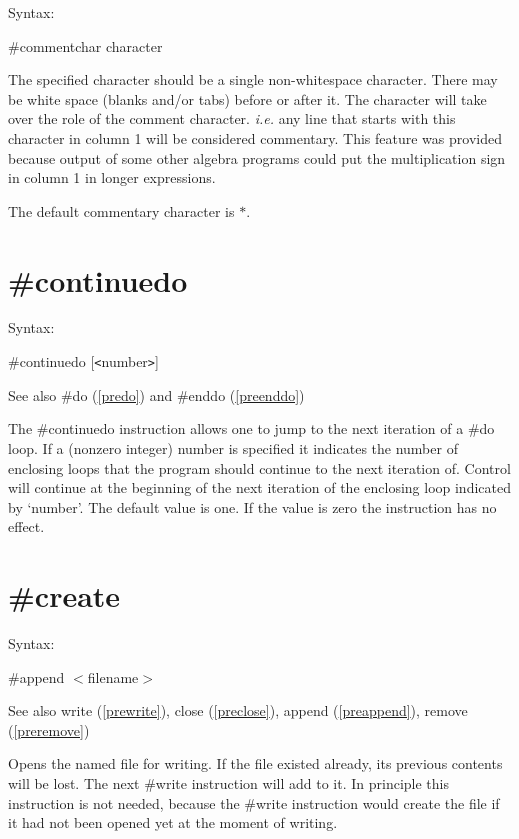 \noindent Syntax:

\#commentchar character

\noindent The specified character should be a single 
non-whitespace character. There may be white space (blanks and/or tabs) 
before or after it. The character will take over the role of the comment 
character. {\it i.e.} any line that starts with this character in column 1 
will be considered commentary. This feature was provided 
because output of some other algebra programs could put the multiplication 
sign in column 1 in longer expressions.

The default commentary character is $\ast$.


\section{\#continuedo}
\label{precontinuedo}

\noindent Syntax:

\#continuedo [{\tt<}number{\tt>}]

\noindent See also \#do (\ref{predo}) and \#enddo (\ref{preenddo})

\noindent The \#continuedo instruction allows one to
jump to the next iteration of a \#do loop.
If a (nonzero integer) number is specified
it indicates the number of enclosing loops
that the program should continue to the next iteration of.
Control will continue at the beginning of the next iteration
of the enclosing loop indicated by `number'.
The default value is one.
If the value is zero the instruction has no effect.

 
\section{\#create}
\label{precreate}

\noindent Syntax:

\#append $<$filename$>$
 
\noindent See also write (\ref{prewrite}),
            close (\ref{preclose}), append (\ref{preappend}),
            remove (\ref{preremove})

\noindent Opens the named file for writing. If the file 
existed already, its previous contents will be lost. The next 
\#write instruction will add to it. In principle this 
instruction is not needed, because the \#write instruction would create the 
file if it had not been opened yet at the moment of writing.

